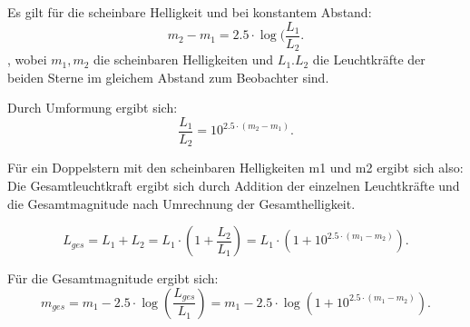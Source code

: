 Es gilt für die scheinbare Helligkeit und bei konstantem Abstand: 
\begin{equation}
m_2 - m_1 = 2.5\cdot \log(\frac{L_1}{L_2}. 
\end{equation}, 
wobei $m_1, m_2$ die scheinbaren Helligkeiten und $L_1. L_2$  die Leuchtkräfte der beiden Sterne im gleichem Abstand zum Beobachter sind.

Durch Umformung ergibt sich: 
\begin{equation}
\frac{L_1}{L_2} = 10^{2.5 \cdot (m_2 - m_1)}. 
\end{equation}

Für ein Doppelstern mit den scheinbaren Helligkeiten m1 und m2 ergibt sich also: 
Die Gesamtleuchtkraft ergibt sich durch Addition der einzelnen Leuchtkräfte und die Gesamtmagnitude nach Umrechnung der Gesamthelligkeit. 

\begin{equation}
L_{ges} = L_1 + L_2 = L_1 \cdot (1 + \frac{L_2}{L_1}) = L_1 \cdot (1 + 10^{2.5 \cdot (m_1 - m_2)}). 
\end{equation}

Für die Gesamtmagnitude ergibt sich:
\begin{equation}
m_{ges} = m_1 - 2.5\cdot \log(\frac{L_{ges}}{L_1}) = m_1 - 2.5\cdot \log(1 + 10^{2.5 \cdot (m_1 - m_2)}).
\end{equation}